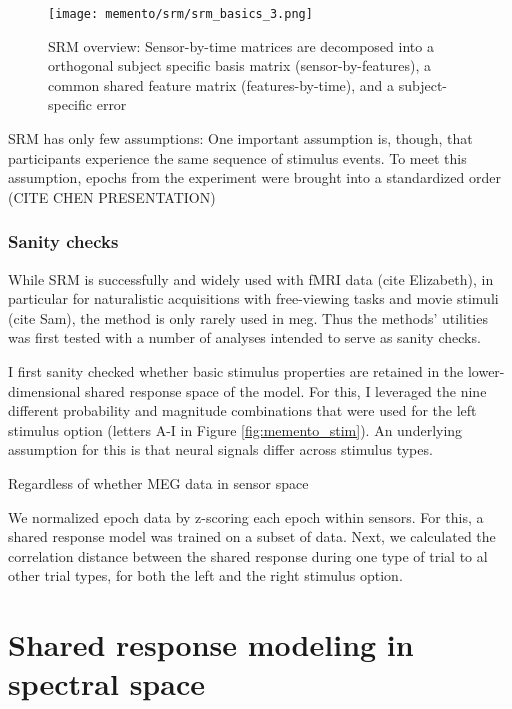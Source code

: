 \begin{figure}
	\centering
	\texttt{[image: memento/srm/srm\_basics\_3.png]}
	\caption[SRM overview]{SRM overview: Sensor-by-time matrices are decomposed into a orthogonal subject specific basis matrix (sensor-by-features), a common shared feature matrix (features-by-time), and a subject-specific error}
	\label{fig:srm-basics-multi}
\end{figure}

\gls{SRM} has only few assumptions: %
One important assumption is, though, that participants experience the same sequence of stimulus events.
To meet this assumption, epochs from the experiment were brought into a standardized order (CITE CHEN PRESENTATION)

\subsubsection{Sanity checks}

While \gls{SRM} is successfully and widely used with fMRI data (cite Elizabeth), in particular for naturalistic acquisitions with free-viewing tasks and movie stimuli (cite Sam), the method is only rarely used in \gls{meg}.
Thus the methods' utilities was first tested with a number of analyses intended to serve as sanity checks.




I first sanity checked whether basic stimulus properties are retained in the lower-dimensional shared response space of the model.
For this, I leveraged the nine different probability and magnitude combinations that were used for the left stimulus option (letters A-I in Figure \ref{fig:memento_stim}).
An underlying assumption for this is that neural signals differ across stimulus types.

Regardless of whether MEG data in sensor space



We normalized epoch data by z-scoring each epoch within sensors.
For this, a shared response model was trained on a subset of data.
Next, we calculated the correlation distance between the shared response during one type of trial to al other trial types, for both the left and the right stimulus option.


\section{Shared response modeling in spectral space}

